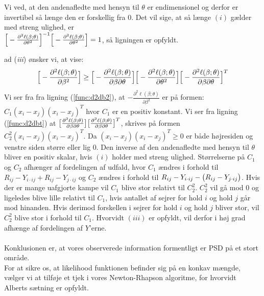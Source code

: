 \documentclass[11pt,a4paper]{article}
\begin{document}
Vi ved, at den andenafledte med hensyn til $\theta$ er endimensionel og derfor er invertibel så længe den er forskellig fra 0. Det vil sige, at så længe $(i)$ gælder med streng ulighed, er
\\ $\Big{[}-\frac{\partial^2 \ell(\beta;\theta)}{\partial \theta^2}\Big{]}^{-1}\Big{[}-\frac{\partial^2 \ell(\beta;\theta)}{\partial \theta^2}\Big{]}=1$, så ligningen er opfyldt.\newline \par
ad (\textit{iii}) ønsker vi, at vise:
\begin{align*}
  \Big{[}-\frac{\partial^2 \ell(\beta;\theta)}{\partial \beta^2}\Big{]} \geq \Big{[}-\frac{\partial^2 \ell(\beta;\theta)}{\partial \beta \partial \theta}\Big{]}\Big{[}-\frac{\partial^2 \ell(\beta;\theta)}{\partial \theta^2}\Big{]}\Big{[}-\frac{\partial^2 \ell(\beta;\theta)}{\partial \beta \partial \theta}\Big{]}^T
\end{align*}
Vi ser fra fra ligning (\ref{func:d2db2}), at $-\frac{\partial^2 \ell(\beta;\theta)}{\partial \beta^2}$ er på formen: $C_1(x_i-x_j)(x_i-x_j)^T$ hvor $C_1$ er en positiv konstant. Vi ser fra ligning (\ref{func:d2dbt}) at $\big{[}\frac{\partial^2 \ell(\beta;\theta)}{\partial \beta \partial \theta}\big{]}\big{[}\frac{\partial^2 \ell(\beta;\theta)}{\partial \beta \partial \theta}\big{]}^T$, skrives på formen $C_2^2(x_i-x_j)(x_i-x_j)^T$. Da $(x_i-x_j)(x_i-x_j)^T\geq0$ er både højresiden og venstre siden større eller lig 0. Den inverse af den andenafledte med hensyn til $\theta$ bliver en positiv skalar, hvis $(i)$ holder med streng ulighed. Størrelserne på $C_1$ og $C_2$ afhænger af fordelingen af udfald, hvor $C_1$ ændres i forhold til $R_{ij}-Y_{i\cdot ij} + R_{ij}-Y_{j\cdot ij}$ og $C_2$ ændres i forhold til $R_{ij}-Y_{i\cdot ij} - \big{(}R_{ij}-Y_{j\cdot ij}\big{)}$. Hvis der er mange uafgjorte kampe vil $C_1$ blive stor relativt til $C_2^2$. $C_2^2$ vil gå mod 0 og ligeledes blive lille relativt til $C_1$, hvis antallet af sejrer for hold $i$ og hold $j$ går mod hinanden. Hvis derimod forskellen i sejrer for hold $i$ og hold $j$ bliver stor, vil $C_2^2$ blive stor i forhold til $C_1$. Hvorvidt $(iii)$ er opfyldt, vil derfor i høj grad afhænge af fordelingen af $Y$'erne. \\\\
Konklusionen er, at vores observerede information formentligt er PSD på et stort område.\\
For at sikre os, at likelihood funktionen befinder sig på en konkav mængde, vælger vi at tilføje et tjek i vores Newton-Rhapson algoritme, for hvorvidt Alberts sætning er opfyldt. \\
\end{document}
